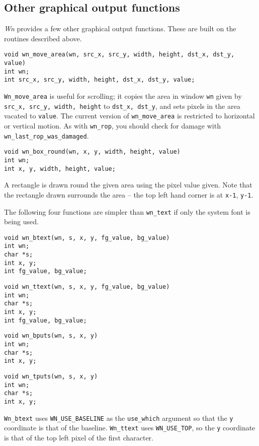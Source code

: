 \subsection{Other graphical output functions}
\label{othergraph}
{\em Wn} provides a few other graphical output functions.
These are built on the routines described above.
\begin{verbatim}
void wn_move_area(wn, src_x, src_y, width, height, dst_x, dst_y, value)
int wn;
int src_x, src_y, width, height, dst_x, dst_y, value;
\end{verbatim}
{\tt Wn\_move\_area} is useful for scrolling; it
copies the area in window {\tt wn} given by {\tt src\_x, src\_y, width, height}
to {\tt dst\_x, dst\_y}, and sets pixels in the area vacated to {\tt value}.
The current version of {\tt wn\_move\_area} is restricted to horizontal
or vertical motion.
As with {\tt wn\_rop}, you should check for damage with
{\tt wn\_last\_rop\_was\_damaged}.
\begin{verbatim}
void wn_box_round(wn, x, y, width, height, value)
int wn;
int x, y, width, height, value;
\end{verbatim}
A rectangle is drawn round the given area using the pixel value given.
Note that the rectangle drawn surrounds the area -- the top left
hand corner is at {\tt x-1}, {\tt y-1}.

The following four functions are simpler than {\tt wn\_text} if only the system
font is being used.
\begin{verbatim}
void wn_btext(wn, s, x, y, fg_value, bg_value)
int wn;
char *s;
int x, y;
int fg_value, bg_value;
\end{verbatim}
\begin{verbatim}
void wn_ttext(wn, s, x, y, fg_value, bg_value)
int wn;
char *s;
int x, y;
int fg_value, bg_value;
\end{verbatim}
\begin{verbatim}
void wn_bputs(wn, s, x, y)
int wn;
char *s;
int x, y;
\end{verbatim}
\begin{verbatim}
void wn_tputs(wn, s, x, y)
int wn;
char *s;
int x, y;
\end{verbatim}

{\tt Wn\_btext} uses {\tt WN\_USE\_BASELINE} as the {\tt use\_which} argument
so that the {\tt y} coordinate is that of the baseline.
{\tt Wn\_ttext} uses {\tt WN\_USE\_TOP}, so the {\tt y} coordinate is that
of the top left pixel of the first character.

